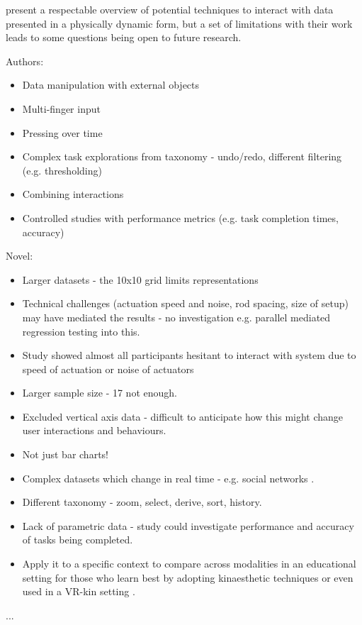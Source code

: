 \documentclass[11pt]{article}
\begin{document}
\citet{taher2015} present a respectable overview of potential techniques to interact with data presented in a physically dynamic form, but a set of limitations with their work leads to some questions being open to future research. 

Authors:
\begin{itemize}
\item Data manipulation with external objects
\item Multi-finger input
\item Pressing over time
\item Complex task explorations from taxonomy - undo/redo, different filtering (e.g. thresholding)
\item Combining interactions
\item Controlled studies with performance metrics (e.g. task completion times, accuracy)
\end{itemize}

Novel:
\begin{itemize}
\item Larger datasets - the 10x10 grid limits representations
\item Technical challenges (actuation speed and noise, rod spacing, size of setup) may have mediated the results - no investigation e.g. parallel mediated regression testing into this.
\item Study showed almost all participants hesitant to interact with system due to speed of actuation or noise of actuators
\item Larger sample size - 17 not enough.
\item Excluded vertical axis data - difficult to anticipate how this might change user interactions and behaviours.
\item Not just bar charts!
\item Complex datasets which change in real time - e.g. social networks \citep{federico2011}.
\item Different taxonomy - zoom, select, derive, sort, history.
\item Lack of parametric data - study could investigate performance and accuracy of tasks being completed.
\item Apply it to a specific context to compare across modalities in an educational setting for those who learn best by adopting kinaesthetic techniques \citep{gilakjani2011} or even used in a VR-kin setting \citep{tennent2017}.
\end{itemize}

...


\newpage
\small

\normalsize
\end{document}
